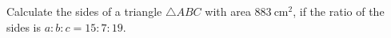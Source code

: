 Calculate the sides of a triangle $\triangle ABC$ with area $\SI{883}{\cm^2}$, if the ratio of the sides is $a:b:c = 15:7:19$.
